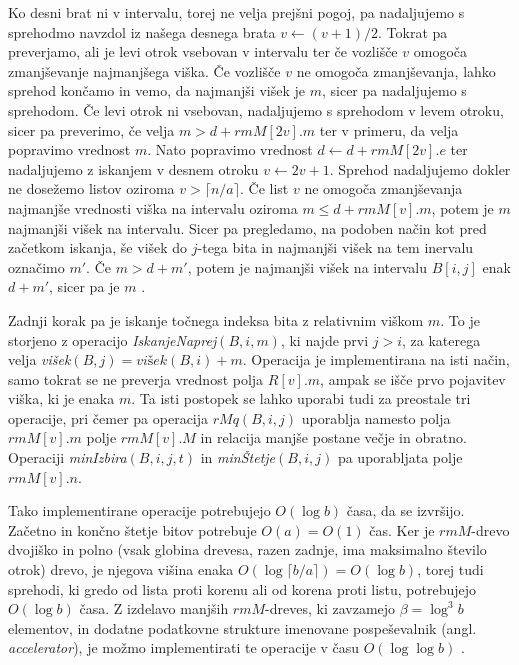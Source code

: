 Ko desni brat ni v intervalu, torej ne velja prejšni pogoj, pa nadaljujemo s sprehodmo navzdol iz našega desnega brata $v\leftarrow (v+1)/2$. Tokrat pa preverjamo, ali je levi otrok vsebovan v intervalu ter če vozlišče $v$ omogoča zmanjševanje najmanjšega viška. Če vozlišče $v$ ne omogoča zmanjševanja, lahko sprehod končamo in vemo, da najmanjši višek je $m$, sicer pa nadaljujemo s sprehodom. Če levi otrok ni vsebovan, nadaljujemo s sprehodom v levem otroku, sicer pa preverimo, če velja $m>d+rmM[2v].m$ ter v primeru, da velja popravimo vrednost $m$. Nato popravimo vrednost $d\leftarrow d+rmM[2v].e$ ter nadaljujemo z iskanjem v desnem otroku $v\leftarrow 2v+1$. Sprehod nadaljujemo dokler ne dosežemo listov oziroma $v>\lceil n/a\rceil$. Če list $v$ ne omogoča zmanjševanja najmanjše vrednosti viška na intervalu oziroma $m\le d+rmM[v].m$, potem je $m$ najmanjši višek na intervalu. Sicer pa pregledamo, na podoben način kot pred začetkom iskanja, še višek do $j$-tega bita in najmanjši višek na tem inervalu označimo $m'$. Če $m>d+m'$, potem je najmanjši višek na intervalu $B[i,j]$ enak $d+m'$, sicer pa je $m$ \cite{Navarro2016}. 

Zadnji korak pa je iskanje točnega indeksa bita z relativnim viškom $m$. To je storjeno z operacijo \textit{IskanjeNaprej}$(B,i,m)$, ki najde prvi $j> i$, za katerega velja \textit{višek}$(B,j)=\textit{višek}(B,i)+m$. Operacija je implementirana na isti način, samo tokrat se ne preverja vrednost polja $R[v].m$, ampak se išče prvo pojavitev viška, ki je enaka $m$. Ta isti  postopek se lahko uporabi tudi za preostale tri operacije, pri čemer pa operacija $rMq(B,i,j)$ uporablja namesto polja $rmM[v].m$ polje $rmM[v].M$ in relacija manjše postane večje in obratno. Operaciji \textit{minIzbira}$(B,i,j,t)$ in \textit{minŠtetje}$(B,i,j)$ pa uporabljata polje $rmM[v].n$\cite{Navarro2016}.

Tako implementirane operacije potrebujejo $O(\log{b})$ časa, da se izvršijo. Začetno in končno štetje bitov potrebuje $O(a)=O(1)$ čas. Ker je $rmM$-drevo dvojiško in polno (vsak globina drevesa, razen zadnje, ima maksimalno število otrok) drevo, je njegova višina enaka $O(\log{\lceil b/a\rceil})=O(\log{b})$, torej tudi sprehodi, ki gredo od lista proti korenu ali od korena proti listu, potrebujejo $O(\log{b})$ časa. Z izdelavo manjših $rmM$-dreves, ki zavzamejo $\beta=\log^3{b}$ elementov, in dodatne podatkovne strukture imenovane pospeševalnik (angl. \textit{accelerator}), je možmo implementirati te operacije v času $O(\log\log{b})$ \cite{Navarro2016}.
